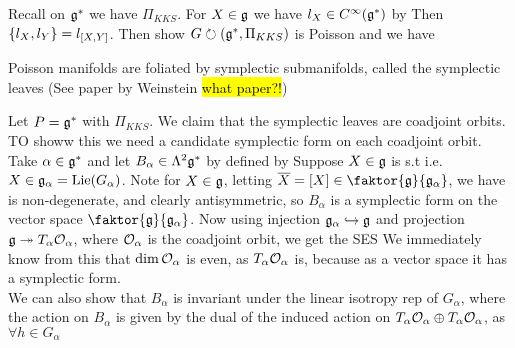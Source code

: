\documentclass{article}
\begin{document}
\begin{ex}\label{ex:CQIS:KKSPoisson}
Recall on $\mf{g}^\ast$ we have $\Pi_{KKS}$. For $X \in \mf{g}$ we have $l_X \in C^\infty(\mf{g}^\ast)$ by 
Then $\acomm[l_X]{l_Y} = l_{\comm[X]{Y}}$. Then show $G \lact (\mf{g}^\ast, \Pi_{KKS})$ is Poisson and we have 
\end{ex}

\begin{fact}
Poisson manifolds are foliated by symplectic submanifolds, called the symplectic leaves (See paper by Weinstein \hl{what paper?!})
\end{fact}

\begin{example}\label{example:CQIS:CoadjointOrbitSymplectic}
Let $P = \mf{g}^\ast$ with $\Pi_{KKS}$. We claim that the symplectic leaves are coadjoint orbits. TO showw this we need a candidate symplectic form on each coadjoint orbit. Take $\alpha \in \mf{g}^\ast$ and let $B_\alpha \in \Lambda^2 \mf{g}^\ast$ by defined by 
Suppose $X \in \mf{g}$ is s.t 
i.e. $X \in \mf{g}_\alpha = \Lie(G_\alpha)$. Note for $X \in \mf{g}$, letting $\bar{X} = [X] \in \faktor{\mf{g}}{\mf{g}_\alpha}$, we have
is non-degenerate, and clearly antisymmetric, so $B_\alpha$ is a symplectic form on the vector space $\faktor{\mf{g}}{\mf{g}_\alpha}$. 
Now using injection $\mf{g}_\alpha \hookrightarrow \mf{g}$ and projection $\mf{g} \twoheadrightarrow T_\alpha \mc{O}_\alpha$, where $\mc{O}_\alpha$ is the coadjoint orbit, we get the SES
We immediately know from this that $\dim\mc{O}_\alpha$ is even, as $T_\alpha \mc{O}_\alpha$ is, because as a vector space it has a symplectic form. \\
We can also show that $B_\alpha$ is invariant under the linear isotropy rep of $G_\alpha$, where the action on $B_\alpha$ is given by the dual of the induced action on $T_\alpha \mc{O}_\alpha\oplus T_\alpha \mc{O}_\alpha$, as $\forall h \in G_\alpha$
\end{example}
\end{document}
